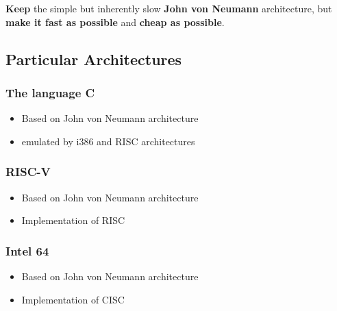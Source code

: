\textbf{Keep} the simple but inherently slow \textbf{John von Neumann}
architecture, but \textbf{make it fast as possible} and \textbf{cheap as
possible}.

\clearpage
\hypertarget{particular-architectures}{%
\subsection{Particular Architectures}\label{particular-architectures}}

\hypertarget{the-language-c}{%
\subsubsection{The language C}\label{the-language-c}}

\begin{itemize}
\tightlist
\item
  Based on John von Neumann architecture
\item
  emulated by i386 and RISC architectures
\end{itemize}

\hypertarget{risc-v}{%
\subsubsection{RISC-V}\label{risc-v}}

\begin{itemize}
\tightlist
\item
  Based on John von Neumann architecture
\item
  Implementation of RISC
\end{itemize}

\hypertarget{intel-64}{%
\subsubsection{Intel 64}\label{intel-64}}

\begin{itemize}
\tightlist
\item
  Based on John von Neumann architecture
\item
  Implementation of CISC
\end{itemize}

\clearpage